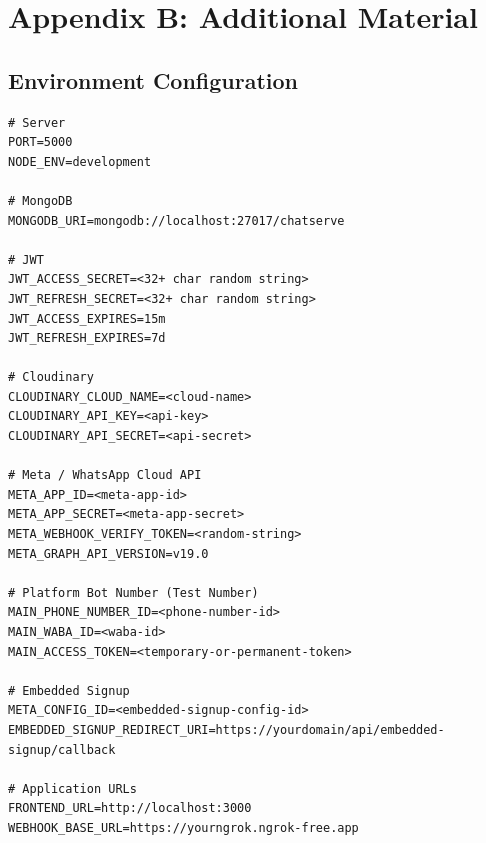 \documentclass[12pt,a4paper]{report}
\begin{document}
\chapter{Appendix B: Additional Material}


\section{Environment Configuration}

\begin{lstlisting}[caption=.env Configuration Reference (Sensitive values redacted)]
# Server
PORT=5000
NODE_ENV=development

# MongoDB
MONGODB_URI=mongodb://localhost:27017/chatserve

# JWT
JWT_ACCESS_SECRET=<32+ char random string>
JWT_REFRESH_SECRET=<32+ char random string>
JWT_ACCESS_EXPIRES=15m
JWT_REFRESH_EXPIRES=7d

# Cloudinary
CLOUDINARY_CLOUD_NAME=<cloud-name>
CLOUDINARY_API_KEY=<api-key>
CLOUDINARY_API_SECRET=<api-secret>

# Meta / WhatsApp Cloud API
META_APP_ID=<meta-app-id>
META_APP_SECRET=<meta-app-secret>
META_WEBHOOK_VERIFY_TOKEN=<random-string>
META_GRAPH_API_VERSION=v19.0

# Platform Bot Number (Test Number)
MAIN_PHONE_NUMBER_ID=<phone-number-id>
MAIN_WABA_ID=<waba-id>
MAIN_ACCESS_TOKEN=<temporary-or-permanent-token>

# Embedded Signup
META_CONFIG_ID=<embedded-signup-config-id>
EMBEDDED_SIGNUP_REDIRECT_URI=https://yourdomain/api/embedded-signup/callback

# Application URLs
FRONTEND_URL=http://localhost:3000
WEBHOOK_BASE_URL=https://yourngrok.ngrok-free.app
\end{lstlisting}
\end{document}
